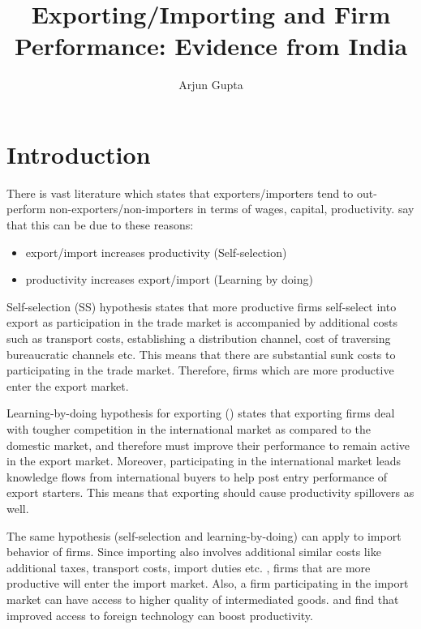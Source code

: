 \documentclass[11pt]{article}
\title{Exporting/Importing and Firm Performance: Evidence from India}
\author{Arjun Gupta}
\begin{document}
\maketitle


\begin{abstract}
 
\end{abstract}


\newpage
\small

\tableofcontents

\newpage

\section{Introduction}\label{sec:introduction}



There is vast literature  which states that exporters/importers tend to
out-perform non-exporters/non-importers  in terms of wages, capital,
productivity. \cite{bernard1999exceptional}  say that this can be due
to these reasons:
\begin{itemize}
\item export/import increases productivity (Self-selection)
\item productivity increases export/import (Learning by doing)
\end{itemize}

Self-selection (SS) hypothesis states that  more productive firms
self-select into export  as  
participation in the trade market is accompanied by additional costs
such as transport costs, establishing a distribution channel,
cost of traversing bureaucratic channels  etc. This means that there
are substantial sunk costs to participating in the trade
market. Therefore, firms which are more productive enter  the
export
market. 

Learning-by-doing hypothesis for exporting (\cite{haidar2012trade}) states that exporting firms deal with
tougher competition in the international market as compared to the
domestic market, and therefore must improve their performance to
remain active in the export market. Moreover, participating in the
international market leads knowledge flows from international buyers
to help post entry performance of export starters. This means that exporting should
cause productivity spillovers as well.

The same hypothesis (self-selection and learning-by-doing) can  apply
to import behavior of firms. Since importing also involves additional
similar costs like additional taxes, transport costs, import duties
etc. , firms that
are more productive will enter the import market. Also, a firm
participating in the import market can have access to higher quality
of intermediated goods. \cite{topalova2011trade}  and \cite{halpern2011imported}
find that improved access to foreign technology can boost
productivity. 
\end{document}
